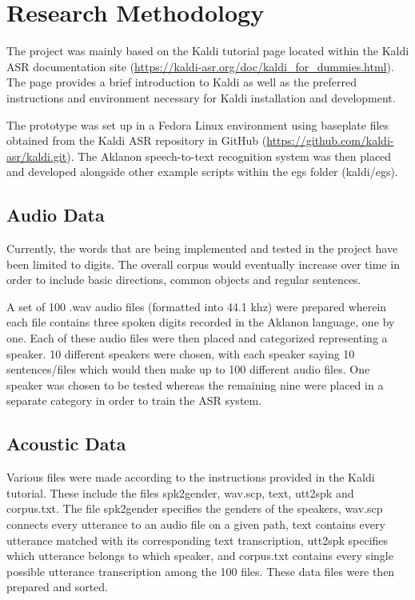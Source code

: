 
\chapter{Research Methodology}

The project was mainly based on the Kaldi tutorial page located within the Kaldi ASR documentation site (\url{https://kaldi-asr.org/doc/kaldi_for_dummies.html}). The page provides a brief introduction to Kaldi as well as the preferred instructions and environment necessary for Kaldi installation and development.

The prototype was set up in a Fedora Linux environment using baseplate files obtained from the Kaldi ASR repository in GitHub (\url{https://github.com/kaldi-asr/kaldi.git}). The Aklanon speech-to-text recognition system was then placed and developed alongside other example scripts within the egs folder (kaldi/egs).

\section{Audio Data}

Currently, the words that are being implemented and tested in the project have been limited to digits. The overall corpus would eventually increase over time in order to include basic directions, common objects and regular sentences.


A set of 100 .wav audio files (formatted into 44.1 khz) were prepared wherein each file contains three spoken digits recorded in the Aklanon language, one by one. Each of these audio files were then placed and categorized representing a speaker. 10 different speakers were chosen, with each speaker saying 10 sentences/files which would then make up to 100 different audio files. One speaker was chosen to be tested whereas the remaining nine were placed in a separate category in order to train the ASR system.

\section{Acoustic Data}

Various files were made according to the instructions provided in the Kaldi tutorial. These include the files spk2gender, wav.scp, text, utt2spk and corpus.txt. The file spk2gender specifies the genders of the speakers, wav.scp connects every utterance to an audio file on a given path, text contains every utterance matched with its corresponding text transcription, utt2spk specifies which utterance belongs to which speaker, and corpus.txt contains every single possible utterance transcription among the 100 files. These data files were then prepared and sorted.

